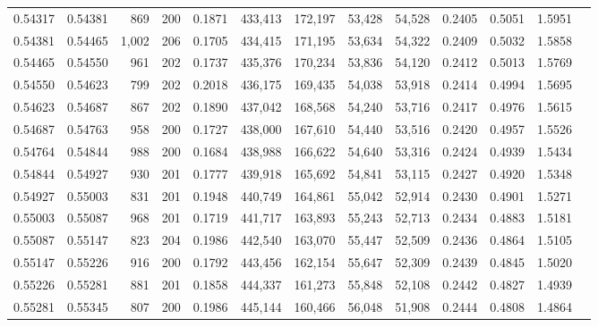 \begin{tabular}{rrrrrrrrrrrrr}
0.54317 & 0.54381 &   869 & 200 &                                     0.1871 & 433,413 & 172,197 &  53,428 &  54,528 & 0.2405 & 0.5051 & 1.5951 \\
0.54381 & 0.54465 & 1,002 & 206 &                                     0.1705 & 434,415 & 171,195 &  53,634 &  54,322 & 0.2409 & 0.5032 & 1.5858 \\
0.54465 & 0.54550 &   961 & 202 &                                     0.1737 & 435,376 & 170,234 &  53,836 &  54,120 & 0.2412 & 0.5013 & 1.5769 \\
0.54550 & 0.54623 &   799 & 202 &                                     0.2018 & 436,175 & 169,435 &  54,038 &  53,918 & 0.2414 & 0.4994 & 1.5695 \\
0.54623 & 0.54687 &   867 & 202 &                                     0.1890 & 437,042 & 168,568 &  54,240 &  53,716 & 0.2417 & 0.4976 & 1.5615 \\
0.54687 & 0.54763 &   958 & 200 &                                     0.1727 & 438,000 & 167,610 &  54,440 &  53,516 & 0.2420 & 0.4957 & 1.5526 \\
0.54764 & 0.54844 &   988 & 200 &                                     0.1684 & 438,988 & 166,622 &  54,640 &  53,316 & 0.2424 & 0.4939 & 1.5434 \\
0.54844 & 0.54927 &   930 & 201 &                                     0.1777 & 439,918 & 165,692 &  54,841 &  53,115 & 0.2427 & 0.4920 & 1.5348 \\
0.54927 & 0.55003 &   831 & 201 &                                     0.1948 & 440,749 & 164,861 &  55,042 &  52,914 & 0.2430 & 0.4901 & 1.5271 \\
0.55003 & 0.55087 &   968 & 201 &                                     0.1719 & 441,717 & 163,893 &  55,243 &  52,713 & 0.2434 & 0.4883 & 1.5181 \\
0.55087 & 0.55147 &   823 & 204 &                                     0.1986 & 442,540 & 163,070 &  55,447 &  52,509 & 0.2436 & 0.4864 & 1.5105 \\
0.55147 & 0.55226 &   916 & 200 &                                     0.1792 & 443,456 & 162,154 &  55,647 &  52,309 & 0.2439 & 0.4845 & 1.5020 \\
0.55226 & 0.55281 &   881 & 201 &                                     0.1858 & 444,337 & 161,273 &  55,848 &  52,108 & 0.2442 & 0.4827 & 1.4939 \\
0.55281 & 0.55345 &   807 & 200 &                                     0.1986 & 445,144 & 160,466 &  56,048 &  51,908 & 0.2444 & 0.4808 & 1.4864 \\

\end{tabular}
